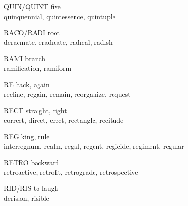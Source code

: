\begin{flashcard}[Roots]{QUIN/QUINT}
five\\
\vspace{0.2in}
quinquennial, quintessence, quintuple\\
\end{flashcard}

\begin{flashcard}[Roots]{RACO/RADI}
root\\
\vspace{0.2in}
deracinate, eradicate, radical, radish\\
\end{flashcard}

\begin{flashcard}[Roots]{RAMI}
branch\\
\vspace{0.2in}
ramification, ramiform\\
\end{flashcard}

\begin{flashcard}[Roots]{RE}
back, again\\
\vspace{0.2in}
recline, regain, remain, reorganize, request\\
\end{flashcard}

\begin{flashcard}[Roots]{RECT}
straight, right\\
\vspace{0.2in}
correct, direct, erect, rectangle, recitude\\
\end{flashcard}

\begin{flashcard}[Roots]{REG}
king, rule\\
\vspace{0.2in}
interregnum, realm, regal, regent, regicide, regiment, regular\\
\end{flashcard}

\begin{flashcard}[Roots]{RETRO}
backward\\
\vspace{0.2in}
retroactive, retrofit, retrograde, retrospective\\
\end{flashcard}

\begin{flashcard}[Roots]{RID/RIS}
to laugh\\
\vspace{0.2in}
derision, risible\\
\end{flashcard}

